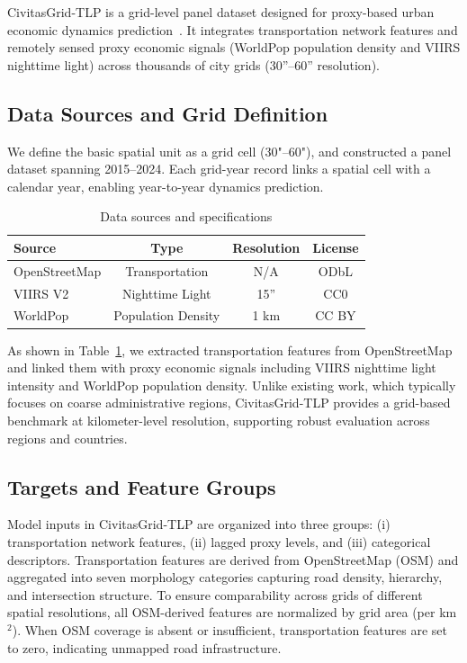 \documentclass[pdflatex,sn-basic,Numbered]{sn-jnl}
\begin{document}
CivitasGrid-TLP is a grid-level panel dataset designed for proxy-based urban economic dynamics prediction~\cite{huang_2026_18144416}. It integrates transportation network features and remotely sensed proxy economic signals (WorldPop population density and VIIRS nighttime light) across thousands of city grids (30''--60'' resolution).

\subsection{Data Sources and Grid Definition}

We define the basic spatial unit as a grid cell (30"–60"), and constructed a panel dataset spanning 2015–2024. Each grid-year record links a spatial cell with a calendar year, enabling year-to-year dynamics prediction.


\begin{table}[htbp]
    \centering

    \begin{tabular}{lccc}
        \toprule
        \textbf{Source} & \textbf{Type} & \textbf{Resolution} & \textbf{License}\\
        \midrule
         OpenStreetMap & Transportation & N/A & ODbL \\
         VIIRS V2 & Nighttime Light & 15'' & CC0 \\
         WorldPop & Population Density & 1 km & CC BY \\
        \bottomrule
    \end{tabular}
    \caption{Data sources and specifications}
    \label{tab:datasources}
    
\end{table}


As shown in Table~\ref{tab:datasources}, we extracted transportation features from OpenStreetMap and linked them with proxy economic signals including VIIRS nighttime light intensity and WorldPop population density. Unlike existing work, which typically focuses on coarse administrative regions, CivitasGrid-TLP provides a grid-based benchmark at kilometer-level resolution, supporting robust evaluation across regions and countries.


\subsection{Targets and Feature Groups}

Model inputs in CivitasGrid-TLP are organized into three groups: (i) transportation network features, (ii) lagged proxy levels, and (iii) categorical descriptors. Transportation features are derived from OpenStreetMap (OSM) and aggregated into seven morphology categories capturing road density, hierarchy, and intersection structure. To ensure comparability across grids of different spatial resolutions, all OSM-derived features are normalized by grid area (per km$^2$). When OSM coverage is absent or insufficient, transportation features are set to zero, indicating unmapped road infrastructure.
\end{document}
